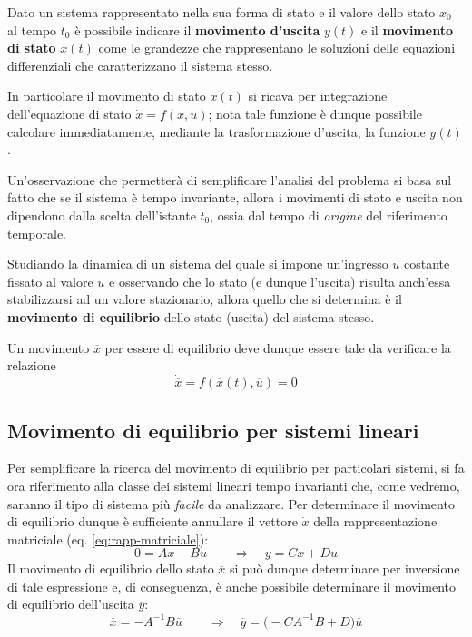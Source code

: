 	\begin{concetto}
		Dato un sistema rappresentato nella sua forma di stato e il valore dello stato $x_0$ al tempo $t_0$ è possibile indicare il \textbf{movimento d'uscita} $y(t)$ e il \textbf{movimento di stato} $x(t)$ come le grandezze che rappresentano le soluzioni delle equazioni differenziali che caratterizzano il sistema stesso.
	\end{concetto}
	In particolare il movimento di stato $x(t)$ si ricava per integrazione dell'equazione di stato $\dot x = f(x,u)$; nota tale funzione è dunque possibile calcolare immediatamente, mediante la trasformazione d'uscita, la funzione $y(t)$.
	
	\begin{nota}
		Un'osservazione che permetterà di semplificare l'analisi del problema si basa sul fatto che se il sistema è tempo invariante, allora i movimenti di stato e uscita non dipendono dalla scelta dell'istante $t_0$, ossia dal tempo di \textit{origine} del riferimento temporale.
	\end{nota}
	
	\begin{concetto} \label{conc:intro:movequilibrio}
		Studiando la dinamica di un sistema del quale si impone un'ingresso $u$ costante fissato al valore $\overline u$ e osservando che lo stato (e dunque l'uscita) risulta anch'essa stabilizzarsi ad un valore stazionario, allora quello che si determina è il \textbf{movimento di equilibrio} dello stato (uscita) del sistema stesso.
		
		Un movimento $\overline x$ per essere di equilibrio deve dunque essere tale da verificare la relazione
		\[ \dot{\overline x} = f\left(\overline x(t), \overline u\right) = 0 \]
	\end{concetto}
	
	\subsection{Movimento di equilibrio per sistemi lineari} 
		Per semplificare la ricerca del movimento di equilibrio per particolari sistemi, si fa ora riferimento alla classe dei sistemi lineari tempo invarianti che, come vedremo, saranno il tipo di sistema più \textit{facile} da analizzare. Per determinare il movimento di equilibrio dunque è sufficiente annullare il vettore $\dot x$ della rappresentazione matriciale (eq. \ref{eq:rapp-matriciale}):
		\[ 0 = Ax + Bu \qquad \Rightarrow \quad y = Cx + Du\]
		Il movimento di equilibrio dello stato $\overline x$ si può dunque determinare per inversione di tale espressione e, di conseguenza, è anche possibile determinare il movimento di equilibrio dell'uscita $\overline y$:
		\begin{equation}
			\overline x = -A ^{-1}B\overline u \qquad \Rightarrow\quad \overline y = \big(-CA^{-1}B + D\big)\overline u
		\end{equation}
		
